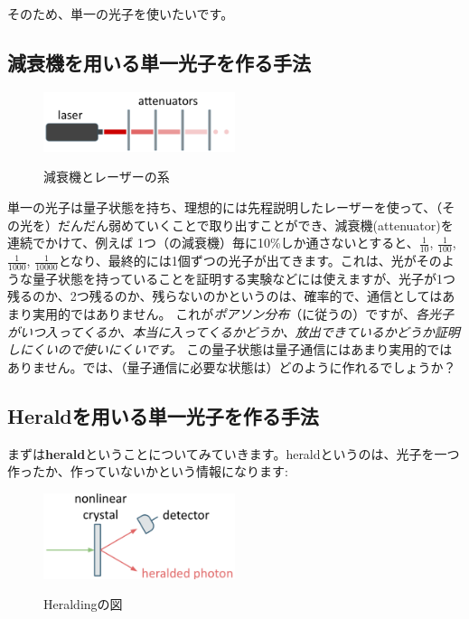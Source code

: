 そのため、単一の光子を使いたいです。
\subsection{減衰機を用いる単一光子を作る手法}
\begin{figure}[H]
    \centering
    \includegraphics[width=0.5\textwidth]{lesson5/laser_attenuator.pdf}
    \label{図: 1}
    \caption{減衰機とレーザーの系}
\end{figure}
単一の光子は量子状態を持ち、理想的には先程説明したレーザーを使って、（その光を）だんだん弱めていくことで取り出すことができ、減衰機(attenuator)を連続でかけて、例えば
1つ（の減衰機）毎に10\%しか通さないとすると、$\frac{1}{10}$, $\frac{1}{100}$, $\frac{1}{1000}$, $\frac{1}{10000}$となり、最終的には1個ずつの光子が出てきます。これは、光がそのような量子状態を持っていることを証明する実験などには使えますが、光子が1つ残るのか、2つ残るのか、残らないのかというのは、確率的で、通信としてはあまり実用的ではありません。
これが\textit{ポアソン分布}（に従うの）ですが、\textit{各光子がいつ入ってくるか、本当に入ってくるかどうか、放出できているかどうか証明しにくいので使いにくいです。
}この量子状態は量子通信にはあまり実用的ではありません。では、（量子通信に必要な状態は）どのように作れるでしょうか？


\subsection{Heraldを用いる単一光子を作る手法}
まずは\textbf{herald}ということについてみていきます。heraldというのは、光子を一つ作ったか、作っていないかという情報になります:
\begin{figure}[H]
    \centering
    \includegraphics[width=0.5\textwidth]{lesson5/heralding.pdf}
    \label{図: 1}
    \caption{Heraldingの図}
\end{figure}

